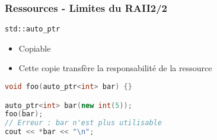 \documentclass[C++.tex]{subfiles}
\begin{document}
\begin{frame}[fragile]
	\frametitle{Ressources - Limites du RAII\titlehfill{}2/2}
	\begin{alertblock}{\lstinline|std::auto_ptr|}
		\begin{itemize}
			\item Copiable
			\item Cette copie transfère la responsabilité de la ressource
		\end{itemize}
	\end{alertblock}

	\begin{lstlisting}[language=C++]
void foo(auto_ptr<int> bar) {}

auto_ptr<int> bar(new int(5));
foo(bar);
// Erreur : bar n'est plus utilisable
cout << *bar << "\n";\end{lstlisting}


\end{frame}
\end{document}
